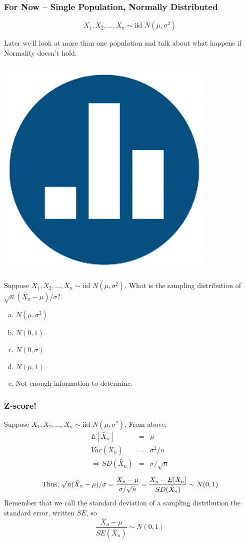 \documentclass[handout]{beamer}
\begin{document}
\begin{frame}
\frametitle{For Now -- Single Population, Normally Distributed}
\Large
$$\boxed{X_1, X_2, \hdots, X_n\sim \mbox{iid } N(\mu,\sigma^2)}$$


\vspace{4em}
\normalsize
\alert{Later we'll look at more than one population and talk about what happens if Normality doesn't hold.}
\end{frame}

\begin{frame}
\frametitle{\includegraphics[scale = 0.05]{./images/clicker}}
Suppose $X_1, X_2, \hdots, X_n \sim \mbox{iid } N(\mu,\sigma^2)$. What is the sampling distribution of $\sqrt{n}(\bar{X}_n - \mu)/\sigma$?


\begin{enumerate}[(a)]
\item $N(\mu, \sigma^2)$
\item $N(0,1)$
\item $N(0,\sigma)$
\item $N(\mu, 1)$
\item Not enough information to determine.
\end{enumerate}

\end{frame}

\begin{frame}
\frametitle{Z-score!}
Suppose $X_1, X_2, \hdots, X_n \sim \mbox{iid } N(\mu,\sigma^2)$. From above,
	\begin{eqnarray*}
			E[\bar{X}_n] &=& \mu\\
			Var(\bar{X}_n) &=&  \sigma^2/n\\ 
			\Rightarrow SD(\bar{X}_n) &=&\sigma/\sqrt{n}
	\end{eqnarray*} 
	$$\text{Thus,\,\,}\sqrt{n}(\bar{X}_n - \mu)/\sigma =  \frac{\bar{X}_n - \mu}{\sigma/\sqrt{n}} =  \frac{\bar{X}_n - E[\bar{X}_n]}{SD(\bar{X}_n)}  \sim N(0,1)$$
Remember that we call the standard deviation of a sampling distribution the \alert{standard error}, written $SE$, so $$\frac{\bar{X}_n - \mu}{SE(\bar{X}_n)} \sim N(0,1)$$
\end{frame}
\end{document}
